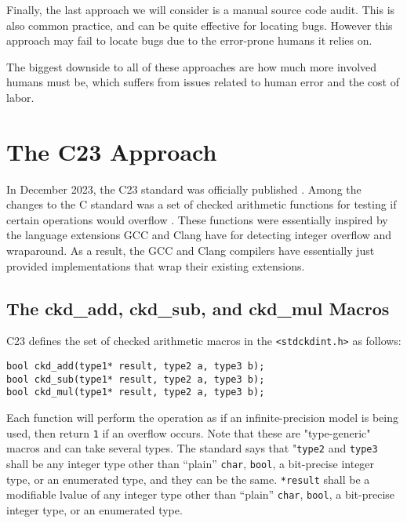 Finally, the last approach we will consider is a manual source code audit. This is also common practice, and can be quite effective for locating bugs. However this approach may fail to locate bugs due to the error-prone humans it relies on.

The biggest downside to all of these approaches are how much more involved humans must be, which suffers from issues related to human error and the cost of labor.

\section{The C23 Approach}

In December 2023, the C23 standard was officially published \cite{c_standard}. Among the changes to the C standard was a set of checked arithmetic functions for testing if certain operations would overflow \cite{ckd_arith}. These functions were essentially inspired by the language extensions GCC and Clang have for detecting integer overflow and wraparound. As a result, the GCC and Clang compilers have essentially just provided implementations that wrap their existing extensions.

\subsection{The ckd\_add, ckd\_sub, and ckd\_mul Macros}

C23 defines the set of checked arithmetic macros in the \texttt{<stdckdint.h>} as follows:

\begin{flushleft}
\texttt{bool ckd\_add(type1* result, type2 a, type3 b);}\\
\texttt{bool ckd\_sub(type1* result, type2 a, type3 b);}\\
\texttt{bool ckd\_mul(type1* result, type2 a, type3 b);}
\end{flushleft}

Each function will perform the operation as if an infinite-precision model is being used, then return \texttt{1} if an overflow occurs. Note that these are "type-generic" macros and can take several types. The standard says that "\texttt{type2} and \texttt{type3} shall be any integer type other than “plain” \texttt{char}, \texttt{bool}, a bit-precise integer type, or an enumerated type, and they can be the same. \texttt{*result} shall be a modifiable lvalue of any integer type other than “plain” \texttt{char}, \texttt{bool}, a bit-precise integer type, or an enumerated type.

